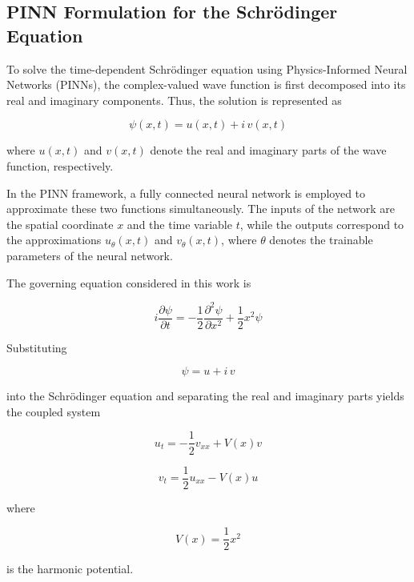 \documentclass[11pt]{article}
\begin{document}
\subsection{PINN Formulation for the Schrödinger Equation}


To solve the time-dependent Schrödinger equation using Physics-Informed Neural Networks (PINNs), 
the complex-valued wave function is first decomposed into its real and imaginary components. 
Thus, the solution is represented as

\begin{equation}
\psi(x,t)=u(x,t)+i\,v(x,t)
\end{equation}

where $u(x,t)$ and $v(x,t)$ denote the real and imaginary parts of the wave function, respectively.

In the PINN framework, a fully connected neural network is employed to approximate these two functions simultaneously. The inputs of the network are the spatial coordinate $x$ and the time variable $t$, while the outputs correspond to the approximations $u_\theta(x,t)$ and $v_\theta(x,t)$, where $\theta$ denotes the trainable parameters of the neural network.

The governing equation considered in this work is

\begin{equation}
i\frac{\partial \psi}{\partial t}
=
-\frac{1}{2}\frac{\partial^2\psi}{\partial x^2}
+
\frac{1}{2}x^2\psi
\label{eq:schrodinger}
\end{equation}

Substituting

\begin{equation}
\psi=u+i\,v
\end{equation}

into the Schrödinger equation and separating the real and imaginary parts yields the coupled system

\begin{equation}
u_t
=
-\frac{1}{2}v_{xx}
+
V(x)v
\end{equation}

\begin{equation}
v_t
=
\frac{1}{2}u_{xx}
-
V(x)u
\end{equation}

where

\begin{equation}
V(x)=\frac{1}{2}x^2
\end{equation}

is the harmonic potential.
\end{document}
